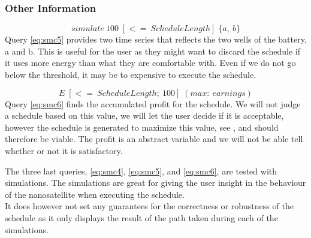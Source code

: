 \subsubsection*{Other Information}
\begin{equation} \label{eq:smc5}
	simulate\ 100 \; [<=\ ScheduleLength]\; \{ a,\ b\}
\end{equation}
Query \ref{eq:smc5} provides two time series that reflects the two wells of the battery, a and b. This is useful for the user as they might want to discard the schedule if it uses more energy than what they are comfortable with. Even if we do not go below the threshold, it may be to expensive to execute the schedule. 

\begin{equation} \label{eq:smc6}
	E \; [<=\ ScheduleLength;\ 100]\; ( max:\ earnings)
\end{equation}
Query \ref{eq:smc6} finds the accumulated profit for the schedule. We will not judge a schedule based on this value, we will let the user decide if it is acceptable, however the schedule is generated to maximize this value, see , and should therefore be viable. The profit is an abstract variable and we will not be able tell whether or not it is satisfactory.

The three last queries, \ref{eq:smc4}, \ref{eq:smc5}, and \ref{eq:smc6}, are tested with simulations. The simulations are great for giving the user insight in the behaviour of the nanosatellite when executing the schedule. \\
It does however not set any guarantees for the correctness or robustness of the schedule as it only displays the result of the path taken during each of the simulations.

